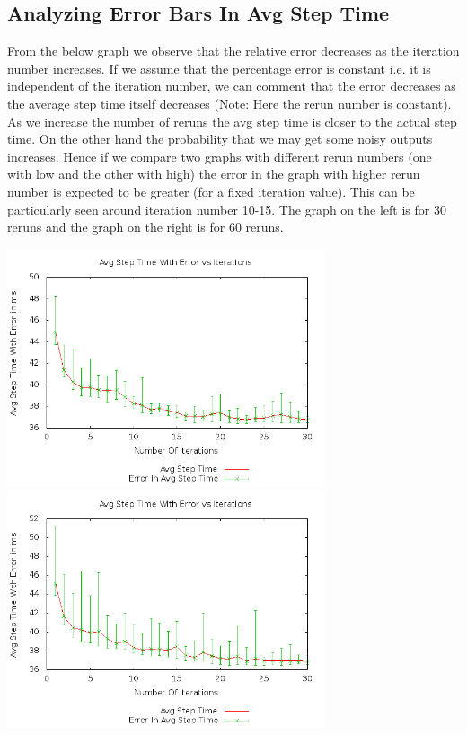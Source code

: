 \documentclass[11pt]{article}
\begin{document}
	\subsection{Analyzing Error Bars In Avg Step Time}
	From the below graph we observe that the relative error decreases as the iteration number increases. If we assume that the percentage error is constant i.e. it is independent of the iteration number, we can comment that the error decreases as the average step time itself decreases (Note: Here the rerun number is constant).
	As we increase the number of reruns the avg step time is closer to the actual step time. On the other hand the probability that we may get some noisy outputs increases. Hence if we compare two graphs with different rerun numbers (one with low and the other with high) the error in the graph with higher rerun number is expected to be greater (for a fixed iteration value). This can be particularly seen around iteration number 10-15. The graph on the left is for 30 reruns and the graph on the right is for 60 reruns. \newline

	\begin{center}\includegraphics[height=7cm]{30_30_plot03.png}\includegraphics[height=7cm]{30_60_plot03.png}\end{center}
	
\end{document}
